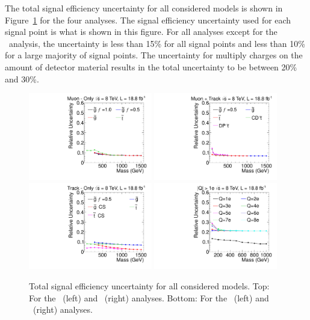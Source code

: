 The total signal efficiency uncertainty for all considered models is shown in
Figure~\ref{fig:TotalUnc} for the four analyses. The signal efficiency uncertainty used for each signal point is what is shown in this figure.
For all analyses except for the \multi\ analysis, the uncertainty is less than 15\% for all signal points and less than 10\% for a large majority of signal points.
The uncertainty for multiply charges on the amount of detector material results in the total uncertainty to be between 20\% and 30\%.

\begin{figure}[ht]
\centering
  \includegraphics[clip=false, trim=0.0cm 0cm 0.0cm 0cm, width=0.48\textwidth]{figures/muonly/MOUncertainty}
  \includegraphics[clip=false, trim=0.0cm 0cm 0.0cm 0cm, width=0.48\textwidth]{figures/tkmu/MuUncertainty}
  \includegraphics[clip=false, trim=0.0cm 0cm 0.0cm 0cm, width=0.48\textwidth]{figures/tkonly/TkUncertainty}
  \includegraphics[clip=false, trim=0.0cm 0cm 0.0cm 0cm, width=0.48\textwidth]{figures/multi/HQUncertainty}
\caption[Total signal efficiency uncertainty for all considered models]
{Total signal efficiency uncertainty for all considered models.
Top:  For the \muononly\ (left) and \tktof\ (right) analyses.
Bottom:  For the \tkonly\ (left) and \multi\ (right) analyses.}
    \label{fig:TotalUnc}
\end{figure}

